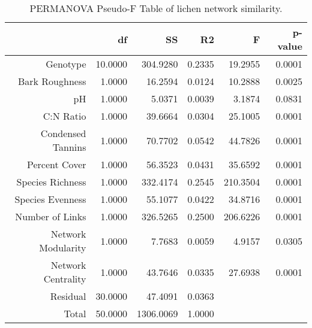 \begin{table}[ht]
\centering
\begin{tabular}{rrrrrr}
  \hline
 & df & SS & R2 & F & p-value \\ 
  \hline
Genotype & 10.0000 & 304.9280 & 0.2335 & 19.2955 & 0.0001 \\ 
  Bark Roughness & 1.0000 & 16.2594 & 0.0124 & 10.2888 & 0.0025 \\ 
  pH & 1.0000 & 5.0371 & 0.0039 & 3.1874 & 0.0831 \\ 
  C:N Ratio & 1.0000 & 39.6664 & 0.0304 & 25.1005 & 0.0001 \\ 
  Condensed Tannins & 1.0000 & 70.7702 & 0.0542 & 44.7826 & 0.0001 \\ 
  Percent Cover & 1.0000 & 56.3523 & 0.0431 & 35.6592 & 0.0001 \\ 
  Species Richness & 1.0000 & 332.4174 & 0.2545 & 210.3504 & 0.0001 \\ 
  Species Evenness & 1.0000 & 55.1077 & 0.0422 & 34.8716 & 0.0001 \\ 
  Number of Links & 1.0000 & 326.5265 & 0.2500 & 206.6226 & 0.0001 \\ 
  Network Modularity & 1.0000 & 7.7683 & 0.0059 & 4.9157 & 0.0305 \\ 
  Network Centrality & 1.0000 & 43.7646 & 0.0335 & 27.6938 & 0.0001 \\ 
  Residual & 30.0000 & 47.4091 & 0.0363 &  &  \\ 
  Total & 50.0000 & 1306.0069 & 1.0000 &  &  \\ 
   \hline
\end{tabular}
\caption{PERMANOVA Pseudo-F Table of lichen network similarity.} 
\label{tab:cn_perm}
\end{table}
